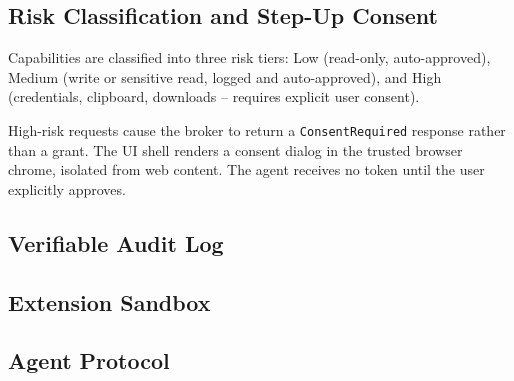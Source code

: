 
\subsection{Risk Classification and Step-Up Consent}

Capabilities are classified into three risk tiers:
Low (read-only, auto-approved), Medium (write or sensitive read,
logged and auto-approved), and High (credentials, clipboard,
downloads -- requires explicit user consent).

High-risk requests cause the broker to return a
\texttt{ConsentRequired} response rather than a grant.
The UI shell renders a consent dialog in the trusted browser chrome,
isolated from web content.
The agent receives no token until the user explicitly approves.

\subsection{Verifiable Audit Log}


\subsection{Extension Sandbox}


\subsection{Agent Protocol}

